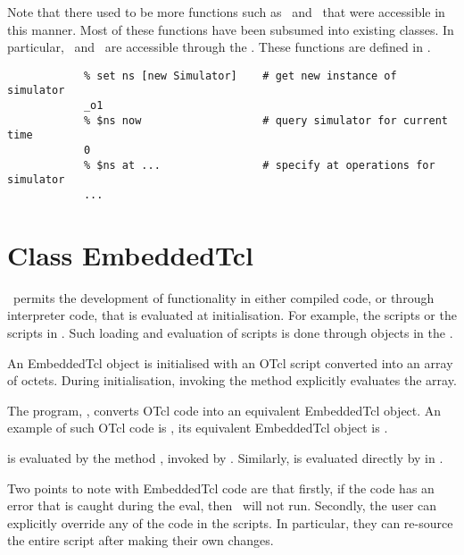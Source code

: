 \documentclass{article}
\begin{document}
Note that there used to be more functions such as \ and
\ that were accessible in this manner.
Most of these functions have been subsumed into existing classes.
In particular, \ and \ are accessible
through the
.
These functions are defined in .
\begin{verbatim}
            % set ns [new Simulator]    # get new instance of simulator
            _o1
            % $ns now                   # query simulator for current time
            0
            % $ns at ...                # specify at operations for simulator
            ...
\end{verbatim}


\section{Class EmbeddedTcl}
\label{sec:EmbeddedTcl}

\ns\ permits the development of functionality in either compiled code,
or through interpreter code, that is evaluated at initialisation.
For example, the scripts  or the scripts in
.
Such loading and evaluation of scripts is done through objects in the
.

An EmbeddedTcl object is initialised with an OTcl script converted into an
array of octets.
During initialisation, invoking the method 
explicitly evaluates the array.

The program, ,
converts OTcl code into an equivalent EmbeddedTcl object.
An example of such OTcl code is ,
its equivalent EmbeddedTcl object is .

 is evaluated by the method
, invoked by .
Similarly,
is evaluated directly by  in .

Two points to note with EmbeddedTcl code are that
firstly, if the code has an error that is caught during the eval,
then \ns\ will not run.
Secondly, the user can explicitly override any of the code in the scripts.
In particular, they can re-source the entire script after making their own
changes. 
\end{document}

